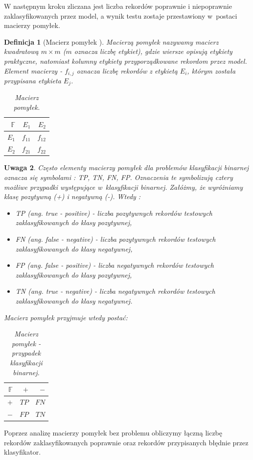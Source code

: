 \documentclass[12pt,a4paper]{report}
\newtheorem{df}{Definicja}[chapter]
\newtheorem{uwaga}[df]{Uwaga}
\begin{document}
W następnym kroku zliczana jest liczba rekordów poprawnie i niepoprawnie zaklasyfikowanych przez model, a wynik testu zostaje przestawiony w~postaci macierzy pomyłek.
\begin{df}[Macierz pomyłek {\citep[Sec 4.8.1]{edmia}}]
Macierzą pomyłek nazywamy macierz kwadratową $ m \times m$ ($m$ oznacza liczbę etykiet), gdzie wiersze opisują etykiety praktyczne, natomiast kolumny etykiety przyporządkowane rekordom przez model. Element macierzy - $f_{i,j}$ oznacza liczbę rekordów z etykietą $E_i$, którym została przypisana etykieta $E_j$.
\begin{table}[H]
\begin{center}
\begin{tabular}{|r|r|r|} \hline
$\mathbb{F}$ & $E_1$ & $E_2$\\
\hline 
$E_1$ & $f_{11}$ & $f_{12}$ \\
\hline
$E_2$ & $f_{21}$ & $f_{22}$  \\
\hline
\end{tabular}
\end{center}
\caption{Macierz pomyłek.}
\label{tabelka}
\end{table}
\end{df}
\begin{uwaga}{\citep[Sec 4.8.1]{edmia}}
Często elementy macierzy pomyłek dla problemów klasyfikacji binarnej oznacza się symbolami : TP, TN, FN, FP. Oznaczenia te symbolizują cztery możliwe przypadki występujące w~klasyfikacji binarnej. Załóżmy, że wyróżniamy klasę pozytywną (+) i negatywną (-). Wtedy :
\begin{itemize}
\item TP (ang. true - positive) - liczba pozytywnych rekordów testowych zaklasyfikowanych do klasy pozytywnej,
\item FN (ang. false - negative) - liczba pozytywnych rekordów testowych zaklasyfikowanych do klasy negatywnej,
\item FP (ang. false - positive) - liczba negatywnych rekordów testowych zaklasyfikowanych do klasy pozytywnej,
\item TN (ang. true - negative) - liczba negatywnych rekordów testowych zaklasyfikowanych do klasy negatywnej.
\end{itemize}
Macierz pomyłek przyjmuje wtedy postać:
\begin{table}[H]
\begin{center}
\begin{tabular}{|r|r|r|} \hline
$\mathbb{F}$ & $+$ & $-$\\
\hline
$+$ & $TP$ & $FN$ \\
\hline
$-$ & $FP$ & $TN$  \\
\hline
\end{tabular}
\end{center}
\caption{Macierz pomyłek - przypadek klasyfikacji binarnej.}
\label{tabelka}
\end{table}
\end{uwaga}
Poprzez analizę macierzy pomyłek bez problemu obliczymy łączną liczbę rekordów zaklasyfikowanych poprawnie oraz rekordów przypisanych błędnie przez klasyfikator. 
\end{document}
